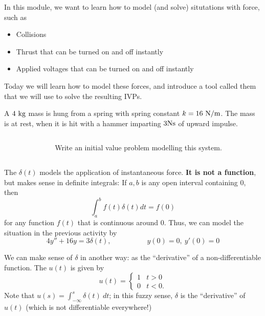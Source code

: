 \begin{applicationActivities}

\begin{observation}
In this module, we want to learn how to model (and solve) situtations with  force, such as
\begin{itemize}
	\item Collisions
	\item Thrust that can be turned on and off instantly
	\item Applied voltages that can be turned on and off instantly
\end{itemize}
\vfill
Today we will learn how to model these forces, and introduce a tool called them  that we will use to solve the resulting IVPs.
\end{observation}


\begin{activity}{10}
A \(4\ {\rm kg}\) mass is hung from a spring with spring constant \(k=16\ {\rm N/m}\).  The mass is at rest, when it is hit with a hammer imparting \(3 {\rm N s}\) of upward impulse.
\vfill
\begin{columns}
\begin{column}{0.3\textwidth}
\begin{center}
\springmass
\end{center}
\end{column}
\begin{column}{0.7\textwidth}
Write an initial value problem modelling this system.
\end{column}
\end{columns}
\end{activity}

\begin{definition}
The  \(\delta(t)\) models the application of instantaneous force.  \textbf{It is not a function}, but makes sense in definite integrals: 
\vfill
If \(a,b\) is any open interval containing \(0\), then
\[ \int _a ^b f(t)\delta(t)dt = f(0)\]
for any function \(f(t)\) that is continuous around \(0\).
\vfill
Thus, we can model the situation in the previous activity by
\[ 4y''+16y=3\delta(t), \hspace{5em} y(0)=0,\ y'(0)=0\]
\end{definition}

\begin{definition}
We can make sense of \(\delta\) in another way: as the ``derivative'' of a non-differentiable function.
\vfill
The  \(u(t)\) is given by \[u(t)=\begin{cases} 1 & t > 0 \\ 0 & t<0. \end{cases}\]
\vfill
Note that \(u(s)=\int _{-\infty} ^s  \delta(t)\ dt\); in this fuzzy sense, \(\delta\) is the ``derivative'' of \(u(t)\) (which is not differentiable everywhere!)
\end{definition}


\end{applicationActivities}
